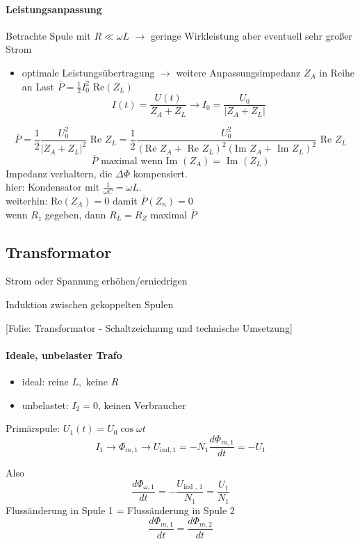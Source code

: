 \documentclass[titlepage,12pt,a4paper,ngerman]{report}
\newcommand{\tx}[1]{\textrm{#1}}
\newcommand{\folie}[1]{\color{gray}[Folie: #1]\color{black}}
\begin{document}
\paragraph{Leistungsanpassung}
Betrachte Spule mit $R\ll \omega L$ $\rightarrow$ geringe Wirkleistung aber eventuell sehr großer Strom
\begin{itemize}
	\item optimale Leistungsübertragung $\rightarrow$ weitere Anpassungsimpedanz $Z_A$ in Reihe an Last $\overline P = \frac{1}{2} I^2_0 \tx{ Re}(Z_L)$
	$$I(t) = \frac{U(t)}{Z_A + Z_L} \rightarrow I_0 = \frac{U_0}{|Z_A + Z_L|}$$
\end{itemize}
$$ \overline{P} = \frac{1}{2} \frac{U_0^2}{|Z_A + Z_L|^2} \tx{ Re } Z_L = \frac{1}{2} \frac{U_0^2}{(\tx{Re } Z_A + \tx{ Re } Z_L)^2 (\tx{Im } Z_A + \tx{ Im } Z_L)^2 } \tx{ Re } Z_L $$
$$\overline P \tx{ maximal wenn Im }(Z_A) = \tx{ Im }(Z_L)$$ Impedanz verhaltern,  die $ \Delta \Phi $ kompensiert.\\
hier: Kondensator mit $ \frac{1}{\omega C} = \omega L $.\\
weiterhin: $ \tx{Re}(Z_A) = 0 $ damit $ \overline{P}(Z_n) = 0 $\\
wenn $ R_z $ gegeben, dann $ R_L = R_Z $ maximal $ \overline{P} $ 
\subsection{Transformator}
\begin{description}
	\item [Ziel] Strom oder Spannung erhöhen/erniedrigen
	\item [Prinzip] Induktion zwischen gekoppelten Spulen
	\item \folie{Transformator - Schaltzeichnung und technische Umsetzung}
\end{description}
\paragraph{Ideale, unbelaster Trafo}
 \begin{itemize}
 	\item ideal: reine $L,$ keine $R$
 	\item unbelastet: $I_2 = 0$, keinen Verbraucher
 \end{itemize}
Primärspule: $U_1(t) = U_0 \cos \omega t$
$$I_1 \rightarrow \Phi_{m,1} \rightarrow U_{\tx{ind},1} = - N_1 \frac{d \Phi_{m,1}}{dt}= - U_1$$

Also $$ \frac{d\Phi_{\omega, 1}}{dt} = - \frac{U_{\tx{ind , 1}}}{N_1} = \frac{U_1}{N_1} $$
Flussänderung in Spule 1 = Flussänderung in Spule 2 
$$\frac{d\Phi_{m,1}}{dt} = \frac{d\Phi_{m,2}}{dt}$$
\end{document}
